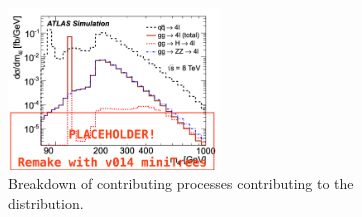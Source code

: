 
\begin{figure}
    \centering
    \includegraphics[width=0.5\textwidth]{Figures/m4l/m4lbreakdown.png}
    \caption{Breakdown of contributing processes contributing to the \mFourL distribution.}
    \label{fig:m4lbreakdown}
\end{figure}

